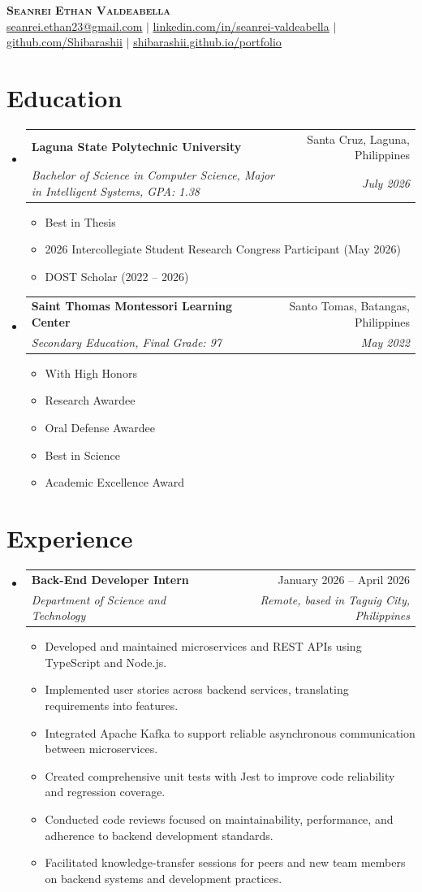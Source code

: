 \documentclass[letterpaper,11pt]{article}
\makeatletter
\newcommand{\resumeItem}[1]{
  \item\small{
    {#1 \vspace{-2pt}}
  }
}
\newcommand{\resumeSubheading}[4]{
  \vspace{-2pt}\item
    \begin{tabular*}{0.97\textwidth}[t]{l@{\extracolsep{\fill}}r}
      \textbf{#1} & #2 \\
      \textit{\small#3} & \textit{\small #4} \\
    \end{tabular*}\vspace{-7pt}
}
\newcommand{\resumeSubHeadingListStart}{\begin{itemize}[leftmargin=0.15in, label={}]}
\newcommand{\resumeSubHeadingListEnd}{\end{itemize}}
\newcommand{\resumeItemListStart}{\begin{itemize}}
\newcommand{\resumeItemListEnd}{\end{itemize}\vspace{-5pt}}
\makeatother
\begin{document}
\begin{center}
    \textbf{\Huge \scshape Seanrei Ethan Valdeabella} \\ \vspace{1pt}
    \small \href{mailto:seanrei.ethan23@gmail.com}{\underline{seanrei.ethan23@gmail.com}} $|$
    \href{https://linkedin.com/in/seanrei-valdeabella/}{\underline{linkedin.com/in/seanrei-valdeabella}} $|$
    \href{https://github.com/Shibarashii}{\underline{github.com/Shibarashii}} $|$
    \href{https://shibarashii.github.io/portfolio/}{\underline{shibarashii.github.io/portfolio}}
\end{center}


\section{Education}
  \resumeSubHeadingListStart
    \resumeSubheading
      {Laguna State Polytechnic University}{Santa Cruz, Laguna, Philippines}
      {Bachelor of Science in Computer Science, Major in Intelligent Systems, GPA: 1.38}{July 2026}
      \resumeItemListStart
        \resumeItem{Best in Thesis}
        \resumeItem{2026 Intercollegiate Student Research Congress Participant (May 2026)}
        \resumeItem{DOST Scholar (2022 -- 2026)}
      \resumeItemListEnd
    \resumeSubheading
      {Saint Thomas Montessori Learning Center}{Santo Tomas, Batangas, Philippines}
      {Secondary Education, Final Grade: 97}{May 2022}
      \resumeItemListStart
        \resumeItem{With High Honors}
        \resumeItem{Research Awardee}
        \resumeItem{Oral Defense Awardee}
        \resumeItem{Best in Science}
        \resumeItem{Academic Excellence Award}
      \resumeItemListEnd
  \resumeSubHeadingListEnd


\section{Experience}
  \resumeSubHeadingListStart
    \resumeSubheading
      {Back-End Developer Intern}{January 2026 -- April 2026}
      {Department of Science and Technology}{Remote, based in Taguig City, Philippines}
      \resumeItemListStart
        \resumeItem{Developed and maintained microservices and REST APIs using TypeScript and Node.js.}
        \resumeItem{Implemented user stories across backend services, translating requirements into features.}
        \resumeItem{Integrated Apache Kafka to support reliable asynchronous communication between microservices.}
        \resumeItem{Created comprehensive unit tests with Jest to improve code reliability and regression coverage.}
        \resumeItem{Conducted code reviews focused on maintainability, performance, and adherence to backend development standards.}
        \resumeItem{Facilitated knowledge-transfer sessions for peers and new team members on backend systems and development practices.}
      \resumeItemListEnd
  \resumeSubHeadingListEnd
\end{document}
